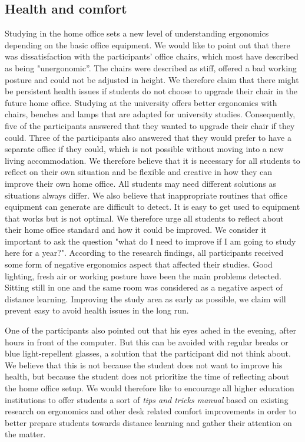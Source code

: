 \documentclass{sigchi}
\begin{document}
\subsection{Health and comfort}
Studying in the home office sets a new level of understanding ergonomics depending on the basic office equipment. We would like to point out that there was dissatisfaction with the participants' office chairs, which most have described as being "unergonomic''. The chairs were described as stiff, offered a bad working posture and could not be adjusted in height. We therefore claim that there might be persistent health issues if students do not choose to upgrade their chair in the future home office. Studying at the university offers better ergonomics with chairs, benches and lamps that are adapted for university studies. Consequently, five of the participants answered that they wanted to upgrade their chair if they could. Three of the participants also answered that they would prefer to have a separate office if they could, which is not possible without moving into a new living accommodation. We therefore believe that it is necessary for all students to reflect on their own situation and be flexible and creative in how they can improve their own home office. All students may need different solutions as situations always differ. We also believe that inappropriate routines that office equipment can generate are difficult to detect. It is easy to get used to equipment that works but is not optimal. We therefore urge all students to reflect about their home office standard and how it could be improved. We consider it important to ask the question "what do I need to improve if I am going to study here for a year?". According to the research findings, all participants received some form of negative ergonomics aspect that affected their studies. Good lighting, fresh air or working posture have been the main problems detected. Sitting still in one and the same room was considered as a negative aspect of distance learning. Improving the study area as early as possible, we claim will prevent easy to avoid health issues in the long run.

One of the participants also pointed out that his eyes ached in the evening, after hours in front of the computer. But this can be avoided with regular breaks or blue light-repellent glasses, a solution that the participant did not think about. We believe that this is not because the student does not want to improve his health, but because the student does not prioritize the time of reflecting about the home office setup. We would therefore like to encourage all higher education institutions to offer students a sort of \emph{tips and tricks manual} based on existing research on ergonomics and other desk related comfort improvements in order to better prepare students towards distance learning and gather their attention on the matter.
\end{document}
